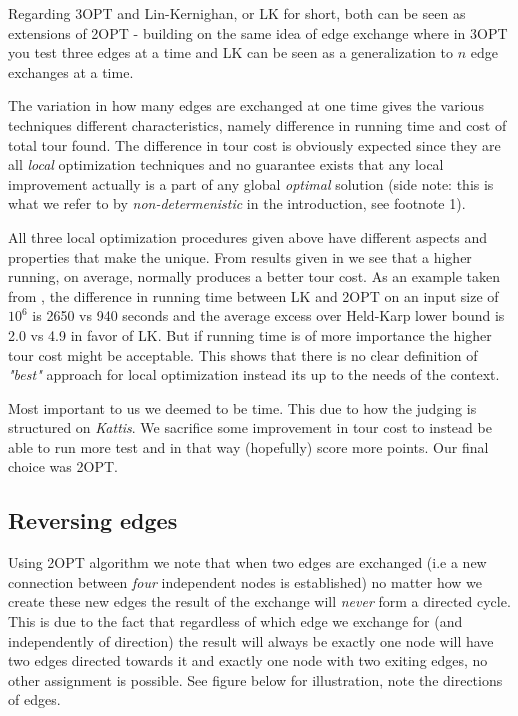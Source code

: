 \documentclass[a4paper,12pt,oneside]{article}
\begin{document}
Regarding 3OPT and Lin-Kernighan, or LK for short, both can be seen as extensions of 2OPT - building on the same idea of edge exchange where in 3OPT you test three edges at a time and LK can be seen as a generalization to $n$ edge exchanges at a time.

The variation in how many edges are exchanged at one time gives the various techniques different characteristics, namely difference in running time and cost of total tour found. The difference in tour cost is obviously expected since they are all \textit{local} optimization techniques and no guarantee exists that any local improvement actually is a part of any global \textit{optimal} solution (side note: this is what we refer to by \textit{non-determenistic} in the introduction, see footnote 1).

All three local optimization procedures given above have different aspects and properties that make the unique. From results given in \cite{localopt} we see that a higher running, on average, normally produces a better tour cost. As an example taken from \cite{localopt}, the difference in running time between LK and 2OPT on an input size of $10^6$ is 2650 vs 940 seconds and the average excess over Held-Karp lower bound is 2.0 vs 4.9 in favor of LK. But if running time is of more importance the higher tour cost might be acceptable. This shows that there is no clear definition of \textit{"best"} approach for local optimization instead its up to the needs of the context. 

Most important to us we deemed to be time. This due to how the judging is structured on \textit{Kattis}. We sacrifice some improvement in tour cost to instead be able to run more test and in that way (hopefully) score more points. Our final choice was 2OPT.



\subsection{Reversing edges}
Using 2OPT algorithm we note that when two edges are exchanged (i.e a new connection between \textit{four} independent nodes is established) no matter how we create these new edges the result of the exchange will \textit{never} form a directed cycle. This is due to the fact that regardless of which edge we exchange for (and independently of direction) the result will always be exactly one node will have two edges directed towards it and exactly one node with two exiting edges, no other assignment is possible. See figure below for illustration, note the directions of edges.
\end{document}
